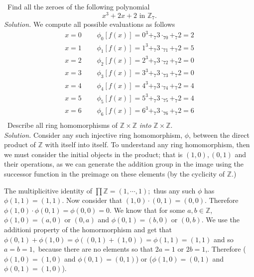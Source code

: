 \documentclass[11pt]{amsart}
\begin{document}
\medskip {}\ Find all the zeroes of the following polynomial
\begin{equation*}
	x^3 + 2x + 2 \text{ in } \mathbb{Z}_7.
\end{equation*}
\emph{Solution.} We compute all possible evaluations as follows
\begin{equation*}
	\begin{aligned}
		x = 0 &\;\;\;\;\; \phi_0[f(x)] = 0^3 +_7 3\cdot_70 +_7 2 = 2\\
x = 1 &\;\;\;\;\; \phi_1[f(x)] = 1^3 +_7 3\cdot_71 +_7 2 = 5\\
x = 2 &\;\;\;\;\; \phi_2[f(x)] = 2^3 +_7 3\cdot_72 +_7 2 = 0\\
x = 3 &\;\;\;\;\; \phi_3[f(x)] = 3^3 +_7 3\cdot_73 +_7 2 = 0\\
x = 4 &\;\;\;\;\; \phi_4[f(x)] = 4^3 +_7 3\cdot_74 +_7 2 = 4\\
x = 5 &\;\;\;\;\; \phi_5[f(x)] = 5^3 +_7 3\cdot_75 +_7 2 = 4\\
x = 6 &\;\;\;\;\; \phi_6[f(x)] = 6^3 +_7 3\cdot_76 +_7 2 = 6\\
	\end{aligned}
\end{equation*}
\medskip {}\ Describe all ring homomorphisms of $\mathbb{Z} \times \mathbb{Z}$ \emph{into} $\mathbb{Z} \times \mathbb{Z}.$ \\
\emph{Solution.} Consider any such injective ring homomorphism, $\phi$, between the direct product of $\mathbb{Z}$ with itself into itself. To understand any ring homomorphism, then we must consider the initial objects in the product; that is $(1,0), (0,1)$ and their operations, as we can generate the addition group in the image using the successor function in the preimage on these elements (by the cyclicity of $\mathbb{Z}.$) 

The multiplicitive identity of $\prod \mathbb{Z} = (1, \cdots, 1);$ thus any such $\phi$ has $\phi(1,1) = (1,1).$ Now consider that $(1,0)\cdot(0,1) = (0,0).$ Therefore $\phi(1,0)\cdot\phi(0,1)= \phi(0,0) = 0.$ We know that for some $a, b\in\mathbb{Z}$, $\phi(1,0) = (a,0)$ or $(0,a)$ and $\phi(0,1) = (b,0)$ or $(0,b)$. We use the additioni property of the homormorphism and get that $\phi(0,1) + \phi (1,0) = \phi((0,1)+(1,0)) = \phi(1,1) = (1,1)$ and so $a = b= 1,$ because there are no elements so that $2a =1$ or $2b = 1$,. Therefore ($\phi(1,0) = (1,0)$ and $\phi(0,1) = (0,1)$) or ($\phi(1,0) = (0,1)$ and $\phi(0,1) = (1,0)$). 
\end{document}
